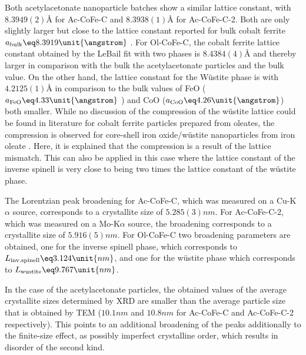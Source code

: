 \documentclass[\main/dresen_thesis.tex]{subfiles}
\begin{document}
    Both acetylacetonate nanoparticle batches show a similar lattice constant, with $8.3949(2) \unit{\angstrom}$ for Ac-CoFe-C and $8.3938(1) \unit{\angstrom}$ for Ac-CoFe-C-2.
    Both are only slightly larger but close to the lattice constant reported for bulk cobalt ferrite $a_\mathrm{bulk} \eq 8.3919 \unit{\angstrom}$ \cite{Stein_2018_Struct}.
    For Ol-CoFe-C, the cobalt ferrite lattice constant obtained by the LeBail fit with two phases is $8.4384(4) \unit{\angstrom}$ and thereby larger in comparison with the bulk the acetylacetonate particles and the bulk value.
    On the other hand, the lattice constant for the W\"ustite phase is with $4.2125(1) \unit{\angstrom}$ in comparison to the bulk values of FeO ($a_\mathrm{FeO} \eq 4.33 \unit{\angstrom}$ \cite{Hentschel_1970_Stoich}) and CoO ($a_\mathrm{CoO} \eq 4.26 \unit{\angstrom}$) both smaller.
    While no discussion of the compression of the w\"ustite lattice could be found in literature for cobalt ferrite particles prepared from oleates, the compression is observed for core-shell iron oxide/w\"ustite nanoparticles from iron oleate  \cite{Wetterskog_2013_Anoma}.
    Here, it is explained that the compression is a result of the lattice mismatch.
    This can also be applied in this case where the lattice constant of the inverse spinell is very close to being two times the lattice constant of the w\"ustite phase.

    The Lorentzian peak broadening for Ac-CoFe-C, which was measured on a Cu-K$\alpha$ source, corresponds to a crystallite size of $5.285(3) \unit{nm}$.
    For Ac-CoFe-C-2, which was measured on a Mo-K$\alpha$ source, the broadening corresponds to a crystallite size of $5.916(5) \unit{nm}$.
    For Ol-CoFe-C two broadening parameters are obtained, one for the inverse spinell phase, which corresponds to $L_{\mathrm{inv. spinell}} \eq 3.124 \unit{nm}$, and one for the w\"ustite phase which corresponds to $L_{\mathrm{wustite}} \eq 9.767 \unit{nm}$.

    In the case of the acetylacetonate particles, the obtained values of the average crystallite sizes determined by XRD are smaller than the average particle size that is obtained by TEM ($10.1 \unit{nm}$ and $10.8 \unit{nm}$ for Ac-CoFe-C and Ac-CoFe-C-2 respectively).
    This points to an additional broadening of the peaks additionally to the finite-size effect, as possibly imperfect crystalline order, which results in disorder of the second kind.
\end{document}
